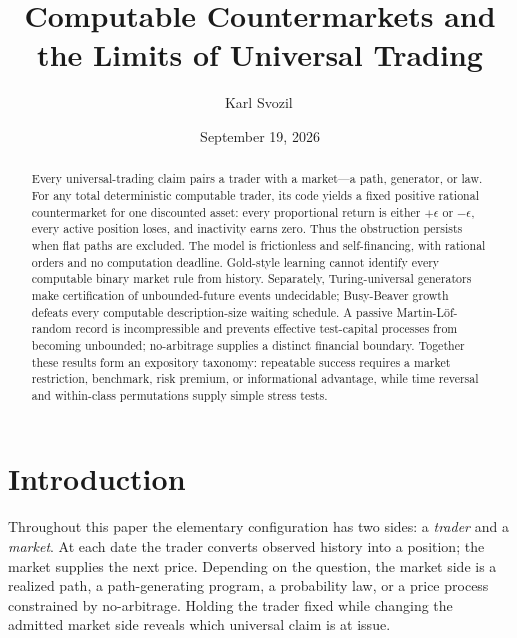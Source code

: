 \documentclass[aps,pra,reprint,superscriptaddress,amsmath,amssymb,floatfix]{revtex4-2}
\theoremstyle{plain}
\theoremstyle{definition}
\theoremstyle{remark}
\begin{document}
\title{Computable Countermarkets and the Limits of Universal Trading}

\author{Karl Svozil\,}

\date{September 19, 2026}

\begin{abstract}
Every universal-trading claim pairs a trader with a market---a path, generator,
or law. For any total deterministic computable trader, its code yields a fixed
positive rational countermarket for one discounted asset: every proportional
return is either \(+\epsilon\) or \(-\epsilon\), every active position loses,
and inactivity earns zero. Thus the obstruction persists when flat paths are
excluded. The model is frictionless and self-financing, with rational orders
and no computation deadline. Gold-style learning cannot
identify every computable binary market rule from history. Separately,
Turing-universal generators make certification of unbounded-future events
undecidable; Busy-Beaver growth defeats every computable description-size
waiting schedule. A passive Martin-L\"of-random record is incompressible and
prevents effective test-capital processes from becoming unbounded;
no-arbitrage supplies a distinct financial boundary. Together these results
form an expository taxonomy: repeatable success requires a market restriction,
benchmark, risk premium, or informational advantage, while time reversal and
within-class permutations supply simple stress tests.
\end{abstract}

\maketitle

\section{Introduction}
\label{sec:intro}

Throughout this paper the elementary configuration has two sides: a
\emph{trader} and a \emph{market}. At each date the trader converts observed
history into a position; the market supplies the next price. Depending on the
question, the market side is a realized path, a path-generating program, a
probability law, or a price process constrained by no-arbitrage. Holding the
trader fixed while changing the admitted market side reveals which universal
claim is at issue.
\end{document}
